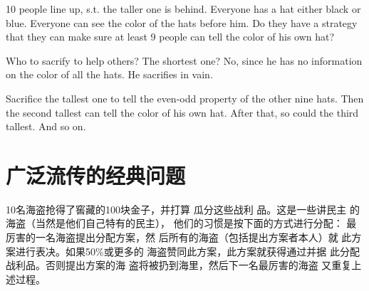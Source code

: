 \begin{example}
\begin{center}
\end{center}

\end{example}


\begin{example}
  10 people line up, s.t. the taller one is behind. Everyone has a hat either black or blue. Everyone can see the color of the hats before him. Do they have a strategy that they can make sure at least 9 people can tell the color of his own hat?

  \begin{center}
  \end{center}

  Who to sacrify to help others? The shortest one? No, since he has no information on the color of all the hats. He sacrifies in vain.

  Sacrifice the tallest one to tell the even-odd property of the other nine hats. Then the second tallest can tell the color of his own hat. After that, so could the third tallest. And so on.
\end{example}


\section{广泛流传的经典问题}
\label{sec:classic-puzzles}

\begin{example}[海盗分金\footnote{\url{https://www.mysmth.net/nForum/\#!elite/path?v=\%2Fgroups\%2Frec.faq\%2FIQDoor\%2Ftoold\%2Fgold}, \url{https://omohundro.files.wordpress.com/2009/03/stewart99_a_puzzle_for_pirates.pdf, 英国数学家伊恩·斯图尔特(Ian Stewart)在1999年5月的《科学美国人》上，发表了A Puzzle for Pirate的文章分析了这个问题。所以，你看，数学家们也会考虑这些看上去不正经的问题，比如诺贝尔经济奖得主纳什研究的博弈理论。}}]
  10名海盗抢得了窖藏的100块金子，并打算 瓜分这些战利 品。这是一些讲民主
  的海盗（当然是他们自己特有的民主）， 他们的习惯是按下面的方式进行分配：
  最厉害的一名海盗提出分配方案，然 后所有的海盗（包括提出方案者本人）就
  此方案进行表决。如果50\%或更多的 海盗赞同此方案，此方案就获得通过并据
  此分配战利品。否则提出方案的海 盗将被扔到海里，然后下一名最厉害的海盗
  又重复上述过程。
\end{example}

